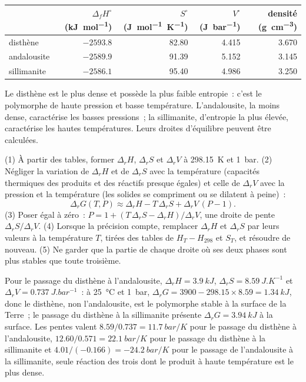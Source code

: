 \begin{center}
\small
\begin{tabular}{@{}lrrrr@{}}
\hline
 & $\Delta_f H^\circ$ (\unit{kJ.mol^{-1}}) & $S^\circ$ (\unit{J.mol^{-1}.K^{-1}}) & $V^\circ$ (\unit{J.bar^{-1}}) & densité (\unit{g.cm^{-3}})\\
\hline
disthène & $-2593.8$ & 82.80 & 4.415 & 3.670\\
andalousite & $-2589.9$ & 91.39 & 5.152 & 3.145\\
sillimanite & $-2586.1$ & 95.40 & 4.986 & 3.250\\
\hline
\end{tabular}
\par{}
\end{center}

Le disthène est le plus dense et possède la plus faible entropie~: c'est le polymorphe
de haute pression et basse température. L'andalousite, la moins dense, caractérise les basses pressions~; la sillimanite,
d'entropie la plus élevée, caractérise les hautes températures. Leurs droites d'équilibre peuvent être calculées.

\begin{method}\label{met:b2:metamorphic-facies:line}
(1) À partir des tables, former $\Delta_r H$, $\Delta_r S$ et $\Delta_r V$ à \qty{298.15}{K}
et \qty{1}{bar}. (2) Négliger la variation de $\Delta_r H$ et de $\Delta_r S$ avec
la température (capacités thermiques des produits et des réactifs presque égales) et celle de $\Delta_r V$
avec la pression et la température (les solides se compriment ou se dilatent à peine)~:
\[
\Delta_r G(T, P) \approx \Delta_r H - T\,\Delta_r S + \Delta_r V\,(P - 1).
\]
(3) Poser égal à zéro~: $P = 1 + (T\,\Delta_r S - \Delta_r H)/\Delta_r V$, une droite de
pente $\Delta_r S/\Delta_r V$. (4) Lorsque la précision compte, remplacer $\Delta_r H$ et
$\Delta_r S$ par leurs valeurs à la température $T$, tirées des tables de $H_T - H_{298}$ et $S_T$,
et résoudre de nouveau. (5) Ne garder que la partie de chaque droite où ses deux phases sont plus stables
que toute troisième.
\end{method}

Pour le passage du disthène à l'andalousite, $\Delta_r H = \qty{3.9}{kJ}$, $\Delta_r S =
\qty{8.59}{J.K^{-1}}$ et $\Delta_r V = \qty{0.737}{J.bar^{-1}}$~: à \qty{25}{\celsius}
et \qty{1}{bar}, $\Delta_r G = 3900 - 298.15\times8.59 = \qty{+1.34}{kJ}$, donc le disthène,
non l'andalousite, est le polymorphe stable à la surface de la Terre~; le passage du disthène à la sillimanite présente
$\Delta_r G = \qty{+3.94}{kJ}$ à la surface. Les pentes valent $8.59/0.737 = \qty{11.7}{bar/K}$ pour
le passage du disthène à l'andalousite, $12.60/0.571 = \qty{22.1}{bar/K}$ pour le passage du disthène à la sillimanite et
$4.01/(-0.166) = \qty{-24.2}{bar/K}$ pour le passage de l'andalousite à la sillimanite, seule réaction des
trois dont le produit à haute température est le plus dense.

